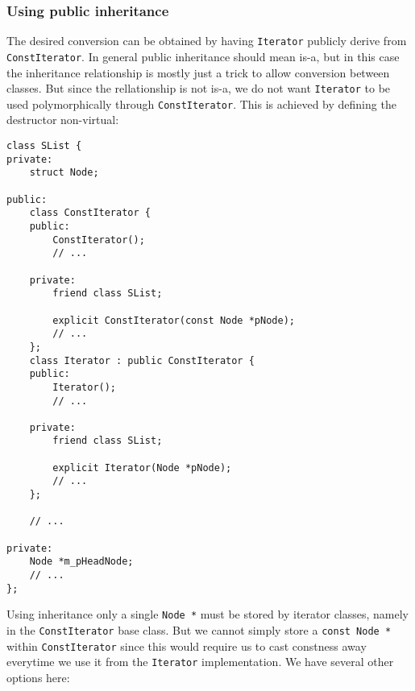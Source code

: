 \subsubsection{Using public inheritance}
The desired conversion can be obtained by having \lstinline!Iterator! publicly derive from \lstinline!ConstIterator!. In general public inheritance should mean is-a, but in this case the inheritance relationship is mostly just a trick to allow conversion between classes. But since the rellationship is not is-a, we do not want \lstinline!Iterator! to be used polymorphically through \lstinline!ConstIterator!. This is achieved by defining the destructor non-virtual:
\begin{lstlisting}[frame=single, caption={SList.h}]
class SList {
private:
    struct Node;

public:
    class ConstIterator {
    public:
        ConstIterator();
        // ...
        
    private:
        friend class SList;
    
        explicit ConstIterator(const Node *pNode);
        // ...
    };
    class Iterator : public ConstIterator {
    public:
        Iterator();
        // ...
        
    private:
        friend class SList;
    
        explicit Iterator(Node *pNode);
        // ...
    };
    
    // ...

private:
    Node *m_pHeadNode;
    // ...
};
\end{lstlisting}
Using inheritance only a single \lstinline!Node *! must be stored by iterator classes, namely in the \lstinline!ConstIterator! base class. But we cannot simply store a \lstinline!const Node *! within \lstinline!ConstIterator! since this would require us to cast constness away everytime we use it from the \lstinline!Iterator! implementation. We have several other options here:
